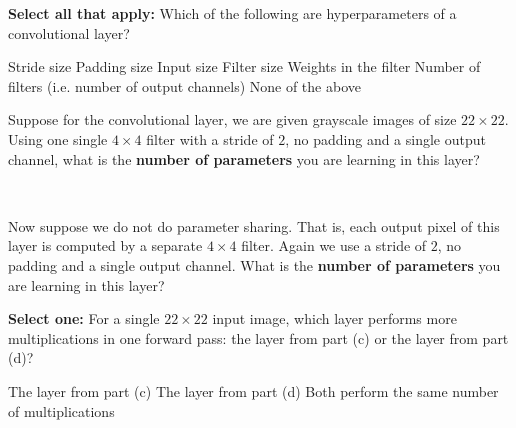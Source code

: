 \documentclass[11pt,addpoints,answers]{exam}
\newcommand{\sall}{\textbf{Select all that apply: }}
\newcommand{\sone}{\textbf{Select one: }}
\begin{document}
\begin{questions}
\begin{parts}
\begin{subparts}
    \vspace{4mm}
    
    \subpart[1] \sall Which of the following are hyperparameters of a convolutional layer?
    \checkboxchar{$\Box$} \checkedchar{$\blacksquare$}
    \begin{checkboxes}
        \choice Stride size
        \choice Padding size
        \choice Input size
        \choice Filter size
        \choice Weights in the filter
        \choice Number of filters (i.e. number of output channels)
        \choice None of the above
    \end{checkboxes}
    
    \vspace{4mm}

    \subpart[1] Suppose for the convolutional layer, we are given grayscale images of size $22\times 22$. Using one single $4 \times 4$ filter with a stride of $2$, no padding and a single output channel, what is the \textbf{number of parameters} you are learning in this layer? \\
    \begin{your_solution}[height=2cm,width=4cm]
    \end{your_solution}\\
    
    \vspace{4mm}
    
    \subpart[1] Now suppose we do not do parameter sharing. That is, each output pixel of this layer is computed by a separate $4 \times 4$ filter. Again we use a stride of $2$, no padding and a single output channel. What is the \textbf{number of parameters} you are learning in this layer? \\
    \begin{your_solution}[height=2cm,width=4cm]
    \end{your_solution}

    \newpage

    \subpart[1] \sone For a single $22 \times 22$ input image, which layer performs more multiplications in one forward pass: the layer from part (c) or the layer from part (d)?
    \checkboxchar{$\bigcirc$} \checkedchar{$\bullet$}
    \begin{checkboxes}
        \choice The layer from part (c)
        \choice The layer from part (d)
        \choice Both perform the same number of multiplications
    \end{checkboxes}


\end{subparts}
\end{parts}
\end{questions}
\end{document}
